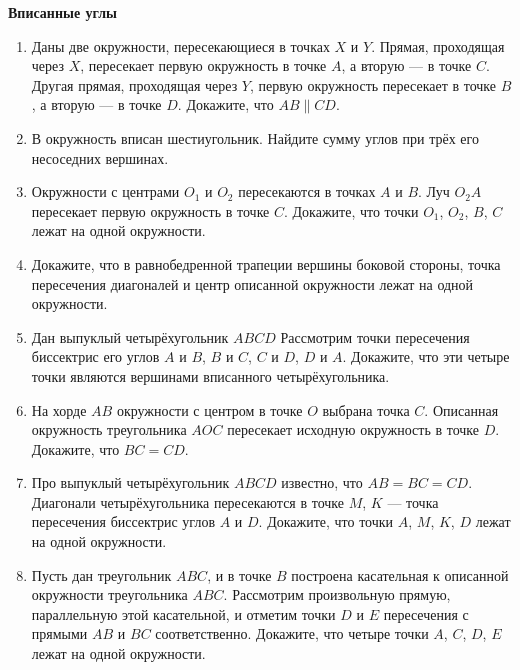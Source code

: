 \documentclass{article}
\begin{document}
\large


\begin{center}
\textbf{Вписанные углы}
\end{center}



\begin{enumerate}[label*=\protect\fbox{\arabic{enumi}}]

\item Даны две окружности, пересекающиеся в точках $X$ и $Y$. Прямая, проходящая через $X$, пересекает первую окружность в точке $A$, а вторую — в точке $C$. Другая прямая, проходящая через $Y$, первую окружность пересекает в точке $B$, а вторую — в точке $D$. Докажите, что $AB \parallel CD$.

\item В окружность вписан шестиугольник. Найдите сумму углов при трёх его несоседних вершинах.

\item Окружности с центрами $O_1$ и $O_2$ пересекаются в точках $A$ и $B$. Луч $O_2A$ пересекает первую окружность в точке $C$. Докажите, что точки $O_1$, $O_2$, $B$, $C$ лежат на одной окружности.

\item Докажите, что в равнобедренной трапеции вершины боковой стороны, точка пересечения диагоналей и центр описанной окружности лежат на одной окружности.

\item Дан выпуклый четырёхугольник $ABCD$ Рассмотрим точки пересечения биссектрис его углов $A$ и $B$, $B$ и $C$, $C$ и $D$, $D$ и $A$. Докажите, что эти четыре точки являются вершинами вписанного четырёхугольника.

\item На хорде $AB$ окружности с центром в точке $O$ выбрана точка $C$. Описанная окружность треугольника $AOC$ пересекает исходную окружность в точке $D$. Докажите, что $BC=CD$.

\item Про выпуклый четырёхугольник $ABCD$ известно, что $AB=BC=CD$. Диагонали четырёхугольника пересекаются в точке $M$, $K$ — точка пересечения биссектрис углов $A$ и $D$. Докажите, что точки $A$, $M$, $K$, $D$ лежат на одной окружности.

\item Пусть дан треугольник $ABC$, и в точке $B$ построена касательная к описанной окружности треугольника $ABC$. Рассмотрим произвольную прямую, параллельную этой касательной, и отметим точки $D$ и $E$ пересечения с прямыми $AB$ и $BC$ соответственно. Докажите, что четыре точки $A$, $C$, $D$, $E$ лежат на одной окружности.


\end{enumerate}
\end{document}

